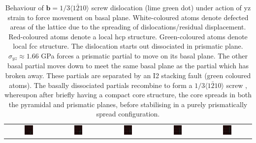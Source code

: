 \documentclass[11pt]{article}
\begin{document}
\begin{enumerate}
\begin{table}
\begin{tabular}{ccccc}
      \includegraphics[width=0.19\textwidth]{Images/basal_strain_peierls_035/crop/basal_yz_strain_11_cluster.png}& 
      \includegraphics[width=0.19\textwidth]{Images/basal_strain_peierls_035/crop/basal_yz_strain_12_cluster.png}& 
      \includegraphics[width=0.19\textwidth]{Images/basal_strain_peierls_035/crop/basal_yz_strain_13_cluster.png}& 
      \includegraphics[width=0.19\textwidth]{Images/basal_strain_peierls_035/crop/basal_yz_strain_14_cluster.png}& 
      \includegraphics[width=0.19\textwidth]{Images/basal_strain_peierls_035/crop/basal_yz_strain_15_cluster.png}\\
   \end{tabular}
   \caption{ Behaviour of $\mathbf{b} = 1/3\langle 1\bar{2}10\rangle$ screw dislocation (lime green dot) under action of yz strain to force movement on basal plane. White-coloured atoms denote defected areas of the lattice due to the spreading of dislocations/residual displacement. Red-coloured atoms denote a local hcp structure. Green-coloured atoms denote local fcc structure. The dislocation starts out dissociated in prismatic plane. $\sigma_{yz} \approx 1.66$ GPa forces a prismatic partial to move on its basal plane. The other basal partial moves down to meet the same basal plane as the partial which has broken away. These partials are separated by an I2 stacking fault (green coloured atoms). The basally dissociated partials recombine to form a $1/3\langle 1\bar{2}10\rangle$ screw , whereupon after briefly having a compact core structure, the core spreads in both the pyramidal and prismatic planes, before stabilising in a purely prismatically spread configuration.  }

\end{table}
\end{enumerate}
\end{document}
